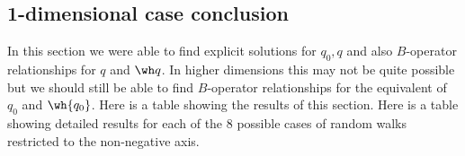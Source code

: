 \subsection{1-dimensional case conclusion}
In this section we were able to find explicit solutions for $q_0, q$ and also $B$-operator relationships for $q$ and $\wh q$. In higher dimensions this may not be quite possible but we should still be able to find $B$-operator relationships for the equivalent of $q_0$ and $\wh{q_0}$. Here is a table showing the results of this section. Here is a table showing detailed results for each of the 8 possible cases of random walks restricted to the non-negative axis.

\endinput
